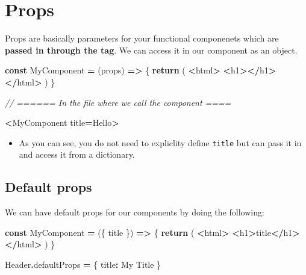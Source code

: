 \documentclass[
]{report}
\newenvironment{Shaded}{\begin{snugshade}}{\end{snugshade}}
\newcommand{\AttributeTok}[1]{\textcolor[rgb]{0.77,0.63,0.00}{#1}}
\newcommand{\CommentTok}[1]{\textcolor[rgb]{0.56,0.35,0.01}{\textit{#1}}}
\newcommand{\ControlFlowTok}[1]{\textcolor[rgb]{0.13,0.29,0.53}{\textbf{#1}}}
\newcommand{\DataTypeTok}[1]{\textcolor[rgb]{0.13,0.29,0.53}{#1}}
\newcommand{\KeywordTok}[1]{\textcolor[rgb]{0.13,0.29,0.53}{\textbf{#1}}}
\newcommand{\NormalTok}[1]{#1}
\newcommand{\OperatorTok}[1]{\textcolor[rgb]{0.81,0.36,0.00}{\textbf{#1}}}
\newcommand{\StringTok}[1]{\textcolor[rgb]{0.31,0.60,0.02}{#1}}
\providecommand{\tightlist}{%
  \setlength{\itemsep}{0pt}\setlength{\parskip}{0pt}}
\begin{document}
\hypertarget{props}{%
\section{Props}\label{props}}

Props are basically parameters for your functional componenets which are \textbf{passed in through the tag}. We can access it in our component as an object.

\begin{Shaded}
\begin{Highlighting}[]
\KeywordTok{const}\NormalTok{ MyComponent }\OperatorTok{=}\NormalTok{ (props) }\KeywordTok{=\textgreater{}}\NormalTok{ \{}
    \ControlFlowTok{return}\NormalTok{ (}
        \OperatorTok{\textless{}}\NormalTok{html}\OperatorTok{\textgreater{}}
            \OperatorTok{\textless{}}\NormalTok{h1}\OperatorTok{\textgreater{}\textless{}/}\NormalTok{h1}\OperatorTok{\textgreater{}}
        \OperatorTok{\textless{}/}\NormalTok{html}\OperatorTok{\textgreater{}} 
\NormalTok{    )}
\NormalTok{\}}

\CommentTok{// ====== In the file where we call the component ====}

\OperatorTok{\textless{}}\NormalTok{MyComponent title}\OperatorTok{=}\StringTok{\textquotesingle{}Hello\textquotesingle{}}\OperatorTok{\textgreater{}}
\end{Highlighting}
\end{Shaded}

\begin{itemize}
\tightlist
\item
  As you can see, you do not need to expliclity define \texttt{title} but can pass it in and access it from a dictionary.
\end{itemize}

\hypertarget{default-props}{%
\subsection{Default props}\label{default-props}}

We can have default props for our components by doing the following:

\begin{Shaded}
\begin{Highlighting}[]
\KeywordTok{const}\NormalTok{ MyComponent }\OperatorTok{=}\NormalTok{ (\{ title \}) }\KeywordTok{=\textgreater{}}\NormalTok{ \{}
    \ControlFlowTok{return}\NormalTok{ (}
        \OperatorTok{\textless{}}\NormalTok{html}\OperatorTok{\textgreater{}}
            \OperatorTok{\textless{}}\NormalTok{h1}\OperatorTok{\textgreater{}}\NormalTok{title}\OperatorTok{\textless{}/}\NormalTok{h1}\OperatorTok{\textgreater{}}
        \OperatorTok{\textless{}/}\NormalTok{html}\OperatorTok{\textgreater{}} 
\NormalTok{    )}
\NormalTok{\}}

\NormalTok{Header}\OperatorTok{.}\AttributeTok{defaultProps} \OperatorTok{=}\NormalTok{ \{}
    \DataTypeTok{title}\OperatorTok{:} \StringTok{\textquotesingle{}My Title\textquotesingle{}}
\NormalTok{\}}
\end{Highlighting}
\end{Shaded}
\end{document}
